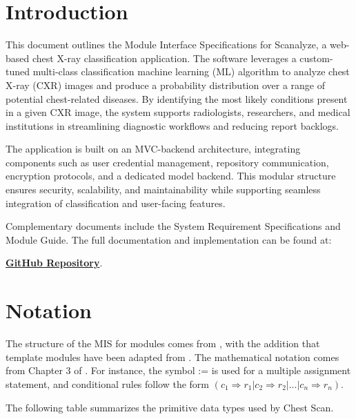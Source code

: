 \documentclass[12pt, titlepage]{article}
\begin{document}
\newpage

\tableofcontents

\newpage


\section{Introduction}

This document outlines the Module Interface Specifications for Scanalyze, a web-based chest X-ray classification application. The software leverages a custom-tuned multi-class classification machine learning (ML) algorithm to analyze chest X-ray (CXR) images and produce a probability distribution over a range of potential chest-related diseases. By identifying the most likely conditions present in a given CXR image, the system supports radiologists, researchers, and medical institutions in streamlining diagnostic workflows and reducing report backlogs.

The application is built on an MVC-backend architecture, integrating components such as user credential management, repository communication, encryption protocols, and a dedicated model backend. This modular structure ensures security, scalability, and maintainability while supporting seamless integration of classification and user-facing features.

Complementary documents include the System Requirement Specifications and Module Guide. The full documentation and implementation can be found at:

\href{https://github.com/harrisonchiu/xray/tree/main}{\textbf{GitHub Repository}}.


\section{Notation}

The structure of the MIS for modules comes from \cite{Hoffman1995}, with the addition that template modules have been adapted from \cite{Ghezzi2003}. The mathematical notation comes from Chapter 3 of \cite{Hoffman1995}. For instance, the symbol := is used for a multiple assignment statement, and conditional rules follow the form $(c_1 \Rightarrow r_1 | c_2 \Rightarrow r_2 | ... | c_n \Rightarrow r_n )$.

The following table summarizes the primitive data types used by Chest Scan.
\end{document}
